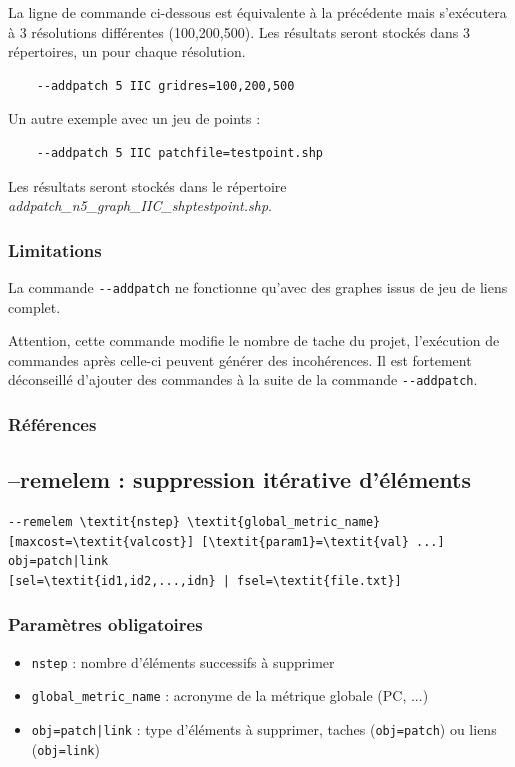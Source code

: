 \documentclass[a4paper,10pt]{report}
\begin{document}
La ligne de commande ci-dessous est équivalente à la précédente mais s'exécutera à 3 résolutions différentes (100,200,500). Les résultats seront stockés dans 3 répertoires, un pour chaque résolution.
\begin{Verbatim}
	--addpatch 5 IIC gridres=100,200,500
\end{Verbatim}

Un autre exemple avec un jeu de points :
\begin{Verbatim}
	--addpatch 5 IIC patchfile=testpoint.shp
\end{Verbatim}
Les résultats seront stockés dans le répertoire \textit{addpatch\_n5\_graph\_IIC\_shptestpoint.shp}.

\subsubsection{Limitations}
La commande \verb|--addpatch| ne fonctionne qu'avec des graphes issus de jeu de liens complet. 

Attention, cette commande modifie le nombre de tache du projet, l'exécution de commandes après celle-ci peuvent générer des incohérences.
Il est fortement déconseillé d'ajouter des commandes à la suite de la commande \verb|--addpatch|.

\subsubsection{Références}
\cite{2015_addpatch_rainette, 2014_LUP}


\subsection{--remelem : suppression itérative d'éléments}
\begin{Verbatim}[commandchars=\\\{\}]
--remelem \textit{nstep} \textit{global_metric_name} [maxcost=\textit{valcost}] [\textit{param1}=\textit{val} ...] obj=patch|link
[sel=\textit{id1,id2,...,idn} | fsel=\textit{file.txt}]
\end{Verbatim}

\subsubsection{Paramètres obligatoires}
\begin{itemize}
	\item \verb|nstep| : nombre d’éléments successifs à supprimer
	\item \verb|global_metric_name| : acronyme de la métrique globale (PC, ...)
	\item \verb+obj=patch|link+ : type d'éléments à supprimer, taches (\verb+obj=patch+) ou liens (\verb+obj=link+)
\end{itemize}
\end{document}
